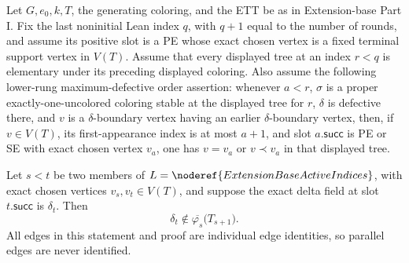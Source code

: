 \begin{helper}
Let \(G,e_0,k,T\), the generating coloring, and the ETT be as in
Extension-base Part I.  Fix the last noninitial Lean index \(q\), with
\(q+1\) equal to the number of rounds, and assume its positive slot is a PE
whose exact chosen vertex is a fixed terminal support vertex in \(V(T)\).
Assume that every displayed tree at an index \(r<q\) is elementary under its
preceding displayed coloring.  Also assume the following lower-rung
maximum-defective order assertion: whenever \(a<r\), \(\sigma\) is a proper
exactly-one-uncolored coloring stable at the displayed tree for \(r\),
\(\delta\) is defective there, and \(v\) is a \(\delta\)-boundary vertex
having an earlier \(\delta\)-boundary vertex, then, if \(v\in V(T)\), its
first-appearance index is at most \(a+1\), and slot \(a.\mathsf{succ}\) is
PE or SE with exact chosen vertex \(v_a\), one has
\(v=v_a\) or \(v\prec v_a\) in that displayed tree.

Let \(s<t\) be two members of
\(L=\noderef{ExtensionBaseActiveIndices}\), with exact chosen vertices
\(v_s,v_t\in V(T)\), and suppose the exact delta field at slot
\(t.\mathsf{succ}\) is \(\delta_t\).  Then
\[
 \delta_t\notin
 \overline{\varphi_s}\bigl(T_{s+1}\bigr).
\]
All edges in this statement and proof are individual edge identities, so
parallel edges are never identified.
\end{helper}
